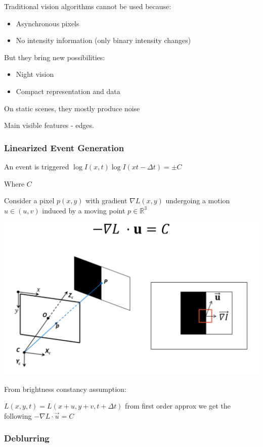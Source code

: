 Traditional vision algorithms cannot be used because:
\begin{itemize}
\item Asynchronous pixels
\item No intensity information (only binary intensity changes)
\end{itemize}

But they bring new possibilities:
\begin{itemize}
\item Night vision
\item Compact representation and data
\end{itemize}

On static scenes, they mostly produce noise

Main visible features - edges. 

\subsubsection{Linearized Event Generation}

An event is triggered $\log I(x,t) \log I(xt-\Delta t)=\pm C$

Where $C$ 

Consider a pixel $p(x,y)$ with gradient $\nabla L(x,y)$ undergoing a motion $u\in(u,v)$ induced by a moving point $p \in\mathbb{R}^3 $

\includegraphics{event_cameras_fig/event_cameras.png}

From brightness constancy assumption:

$L(x,y,t) = L(x+u,y+v,t+\Delta t)$ from first order approx we get the following $-\nabla L \cdot \vec u = C$

\subsubsection{Deblurring}

